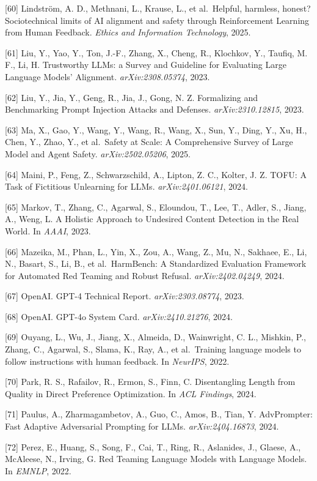 {[}60{]} Lindström, A. D., Methnani, L., Krause, L., et al.~Helpful, harmless, honest? Sociotechnical limits of AI alignment and safety through Reinforcement Learning from Human Feedback. \emph{Ethics and Information Technology}, 2025.

{[}61{]} Liu, Y., Yao, Y., Ton, J.-F., Zhang, X., Cheng, R., Klochkov, Y., Taufiq, M. F., Li, H. Trustworthy LLMs: a Survey and Guideline for Evaluating Large Language Models' Alignment. \emph{arXiv:2308.05374}, 2023.

{[}62{]} Liu, Y., Jia, Y., Geng, R., Jia, J., Gong, N. Z. Formalizing and Benchmarking Prompt Injection Attacks and Defenses. \emph{arXiv:2310.12815}, 2023.

{[}63{]} Ma, X., Gao, Y., Wang, Y., Wang, R., Wang, X., Sun, Y., Ding, Y., Xu, H., Chen, Y., Zhao, Y., et al.~Safety at Scale: A Comprehensive Survey of Large Model and Agent Safety. \emph{arXiv:2502.05206}, 2025.

{[}64{]} Maini, P., Feng, Z., Schwarzschild, A., Lipton, Z. C., Kolter, J. Z. TOFU: A Task of Fictitious Unlearning for LLMs. \emph{arXiv:2401.06121}, 2024.

{[}65{]} Markov, T., Zhang, C., Agarwal, S., Eloundou, T., Lee, T., Adler, S., Jiang, A., Weng, L. A Holistic Approach to Undesired Content Detection in the Real World. In \emph{AAAI}, 2023.

{[}66{]} Mazeika, M., Phan, L., Yin, X., Zou, A., Wang, Z., Mu, N., Sakhaee, E., Li, N., Basart, S., Li, B., et al.~HarmBench: A Standardized Evaluation Framework for Automated Red Teaming and Robust Refusal. \emph{arXiv:2402.04249}, 2024.

{[}67{]} OpenAI. GPT-4 Technical Report. \emph{arXiv:2303.08774}, 2023.

{[}68{]} OpenAI. GPT-4o System Card. \emph{arXiv:2410.21276}, 2024.

{[}69{]} Ouyang, L., Wu, J., Jiang, X., Almeida, D., Wainwright, C. L., Mishkin, P., Zhang, C., Agarwal, S., Slama, K., Ray, A., et al.~Training language models to follow instructions with human feedback. In \emph{NeurIPS}, 2022.

{[}70{]} Park, R. S., Rafailov, R., Ermon, S., Finn, C. Disentangling Length from Quality in Direct Preference Optimization. In \emph{ACL Findings}, 2024.

{[}71{]} Paulus, A., Zharmagambetov, A., Guo, C., Amos, B., Tian, Y. AdvPrompter: Fast Adaptive Adversarial Prompting for LLMs. \emph{arXiv:2404.16873}, 2024.

{[}72{]} Perez, E., Huang, S., Song, F., Cai, T., Ring, R., Aslanides, J., Glaese, A., McAleese, N., Irving, G. Red Teaming Language Models with Language Models. In \emph{EMNLP}, 2022.


